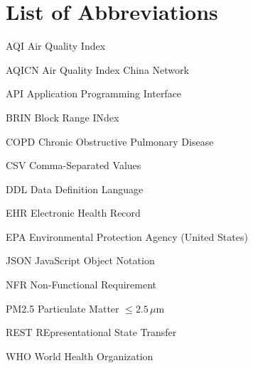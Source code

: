 \chapter*{List of Abbreviations}

\begin{abbrv}
    \item[AQI]     Air Quality Index
    \item[AQICN]   Air Quality Index China Network
    \item[API]     Application Programming Interface
    \item[BRIN]    Block Range INdex
    \item[COPD]    Chronic Obstructive Pulmonary Disease
    \item[CSV]     Comma-Separated Values
    \item[DDL]     Data Definition Language
    \item[EHR]     Electronic Health Record
    \item[EPA]     Environmental Protection Agency (United States)
    \item[JSON]    JavaScript Object Notation
    \item[NFR]     Non-Functional Requirement
    \item[PM2.5]   Particulate Matter $\leq 2.5\,\mu$m
    \item[REST]    REpresentational State Transfer
    \item[WHO]     World Health Organization
\end{abbrv}
